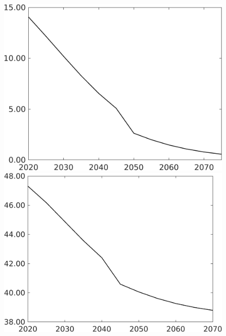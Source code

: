 \documentclass[12pt]{article}
\begin{document}
\begin{figure}[h!!]
\begin{minipage}[]{0.32\textwidth}
	\end{minipage}
	\begin{minipage}[]{0.32\textwidth}
		\includegraphics[width=1\textwidth]{../../codding_model/own_basedOnFried/optimalPol_010922_revision/figures/all_13Sept22/CompTaufPER_bytaul_Equlab_Reg0_sn_spillover0_nsk0_xgr0_knspil1_sep0_LFlimit1_emsbase0_countec0_GovRev0_etaa0.79_lgd0.png}
	\end{minipage}		
	\begin{minipage}[]{0.32\textwidth}
		\includegraphics[width=1\textwidth]{../../codding_model/own_basedOnFried/optimalPol_010922_revision/figures/all_13Sept22/CompTaufPER_bytaul_Equlab_Reg0_gAf_spillover0_nsk0_xgr0_knspil1_sep0_LFlimit1_emsbase0_countec0_GovRev0_etaa0.79_lgd0.png}

\end{minipage}
\end{figure}
\end{document}
